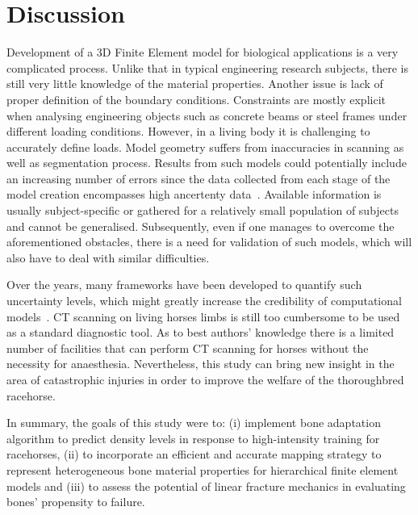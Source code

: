 \documentclass[review]{elsarticle}
\numberwithin{equation}{section}
\begin{document}
\section{Discussion}\label{sec:discussion}
Development of a 3D Finite Element model for biological applications is a very complicated process. 
Unlike that in typical engineering research subjects, there is still very little knowledge of the material properties. 
Another issue is lack of proper definition of the boundary conditions. Constraints are mostly explicit when analysing engineering objects such as concrete beams or steel frames under different loading conditions. 
However, in a living body it is challenging to accurately define loads. 
Model geometry suffers from inaccuracies in scanning as well as segmentation process. 
Results from such models could potentially include an increasing number of errors since the data collected from each stage of the 
model creation encompasses high ancertenty data~\citep{campoli2014effects}.
Available information is usually subject-specific or gathered for a relatively small population of subjects and cannot be generalised. 
Subsequently, even if one manages to overcome the aforementioned obstacles, there is a need for validation of such models, which will also have to deal with similar difficulties. 

Over the years, many frameworks have been developed to quantify such uncertainty levels, which might greatly increase the credibility of computational models~\citep{wille2016uncertainty}. 
CT scanning on living horses limbs is still too cumbersome to be used as a standard diagnostic tool.
As to best authors' knowledge there is a limited number of facilities that can perform CT scanning for horses without the necessity for anaesthesia. 
Nevertheless, this study can bring new insight in the area of catastrophic injuries in order to improve the welfare of the thoroughbred racehorse. %

In summary, the goals of this study were to: (i) implement bone adaptation algorithm to predict density levels in response to high-intensity training 
for racehorses, (ii) to incorporate an efficient and accurate mapping strategy to represent heterogeneous bone material properties for hierarchical 
finite element models and (iii) to assess the potential of linear fracture mechanics in evaluating bones' propensity to failure. 
\end{document}
